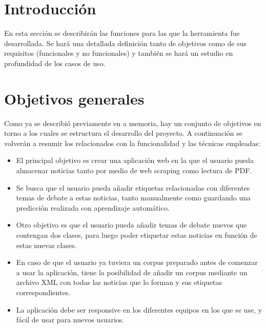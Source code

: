 
\section{Introducción}

En esta sección se describirán las funciones para las que la herramienta fue desarrollada. Se hará una detallada definición tanto de objetivos como de sus requisitos (funcionales y no funcionales) y también se hará un estudio en profundidad de los casos de uso.

\section{Objetivos generales}

Como ya se describió previamente en a memoria, hay un conjunto de objetivos en torno a los cuales se estructura el desarrollo del proyecto. A continuación se volverán a resumir los relacionados con la funcionalidad y las técnicas empleadas:

\begin{itemize}

\item El principal objetivo es crear una aplicación web en la que el usuario pueda almacenar noticias tanto por medio de web scraping como lectura de PDF.

\item Se busca que el usuario pueda añadir etiquetas  relacionadas con diferentes temas de debate a estas noticias, tanto manualmente como guardando una predicción realizada con aprendizaje automático.

\item Otro objetivo es que el usuario pueda añadir temas de debate nuevos que contengan dos clases, para luego poder etiquetar estas noticias en función de estas nuevas clases.

\item En caso de que el usuario ya tuviera un corpus preparado antes de comenzar a usar la aplicación, tiene la posibilidad de añadir un corpus mediante un archivo XML con todas las noticias que lo forman y sus etiquetas correspondientes.

\item La aplicación debe ser responsive en los diferentes equipos en los que se use, y fácil de usar para nuevos usuarios.


\end{itemize}

